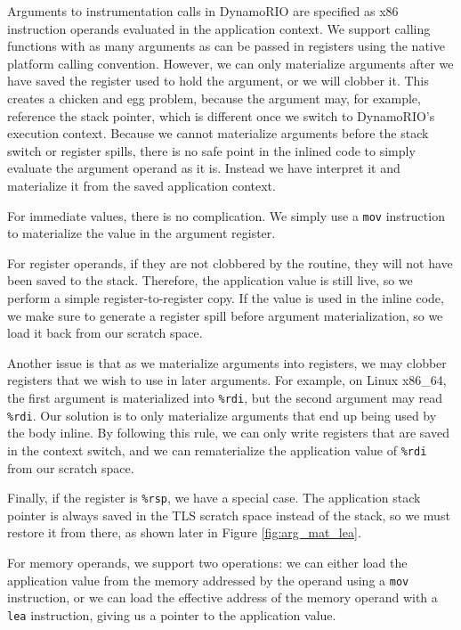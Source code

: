 Arguments to instrumentation calls in DynamoRIO are specified as x86 instruction
operands evaluated in the application context.  We support calling functions
with as many arguments as can be passed in registers using the native platform
calling convention.  However, we can only materialize arguments after we have
saved the register used to hold the argument, or we will clobber it.  This
creates a chicken and egg problem, because the argument may, for example,
reference the stack pointer, which is different once we switch to DynamoRIO's
execution context.  Because we cannot materialize arguments before the stack
switch or register spills, there is no safe point in the inlined code to simply
evaluate the argument operand as it is.  Instead we have interpret it and
materialize it from the saved application context.

For immediate values, there is no complication.  We simply use a {\tt mov}
instruction to materialize the value in the argument register.

For register operands, if they are not clobbered by the routine, they will not
have been saved to the stack.  Therefore, the application value is still live,
so we perform a simple register-to-register copy.  If the value is used in the
inline code, we make sure to generate a register spill before argument
materialization, so we load it back from our scratch space.

Another issue is that as we materialize arguments into registers, we may clobber
registers that we wish to use in later arguments.  For example, on Linux
x86\_64, the first argument is materialized into {\tt \%rdi}, but the second
argument may read {\tt \%rdi}.  Our solution is to only materialize arguments
that end up being used by the body inline.  By following this rule, we can only
write registers that are saved in the context switch, and we can rematerialize
the application value of {\tt \%rdi} from our scratch space.

Finally, if the register is {\tt \%rsp}, we have a special case.  The
application stack pointer is always saved in the TLS scratch space instead of
the stack, so we must restore it from there, as shown later in Figure
\ref{fig:arg_mat_lea}.

For memory operands, we support two operations: we can either load the
application value from the memory addressed by the operand using a {\tt mov}
instruction, or we can load the effective address of the memory operand with a
{\tt lea} instruction, giving us a pointer to the application value.

